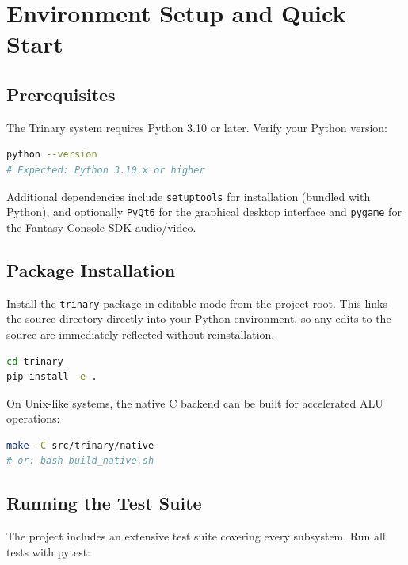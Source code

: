 \chapter{Environment Setup and Quick Start}

\section{Prerequisites}

The Trinary system requires Python 3.10 or later. Verify your Python version:

\begin{lstlisting}[language=bash, caption={Checking Python version}, label={lst:python-version}]
python --version
# Expected: Python 3.10.x or higher
\end{lstlisting}

Additional dependencies include \texttt{setuptools} for installation (bundled with Python), and optionally \texttt{PyQt6} for the graphical desktop interface and \texttt{pygame} for the Fantasy Console SDK audio/video.

\section{Package Installation}

Install the \texttt{trinary} package in editable mode from the project root. This links the source directory directly into your Python environment, so any edits to the source are immediately reflected without reinstallation.

\begin{lstlisting}[language=bash, caption={Installing the trinary package}, label={lst:install}]
cd trinary
pip install -e .
\end{lstlisting}

On Unix-like systems, the native C backend can be built for accelerated ALU operations:

\begin{lstlisting}[language=bash, caption={Building the native C backend (optional)}, label={lst:native-build}]
make -C src/trinary/native
# or: bash build_native.sh
\end{lstlisting}

\section{Running the Test Suite}

The project includes an extensive test suite covering every subsystem. Run all tests with pytest:

